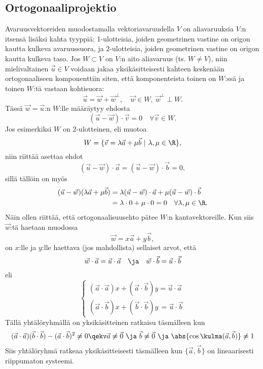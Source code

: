 
\subsection*{Ortogonaaliprojektio}

Avaruusvektoreiden muodostamalla vektoriavaruudella $V$ on aliavaruuksia $V$:n itsensä lisäksi
kahta tyyppiä: 1-ulotteisia, joiden geometrinen vastine on origon kautta kulkeva avaruussuora,
ja 2-ulotteisia, joiden geometrinen vastine on origon kautta kulkeva taso.
Jos $W \subset V$ on $V$:n aito aliavaruus (ts. $W \neq V$), niin mielivaltainen $\vec u \in V$
voidaan jakaa yksikäsitteisesti kahteen keskenään ortogonaaliseen komponenttiin siten, että 
komponenteista toinen on $W$:ssä ja toinen $W$:tä vastaan kohtisuora:
\[
\vec u = \vec w + \vec w^{\perp}, \quad  \vec w \in W, \ \vec w^{\perp} \perp W.
\]
Tässä $\vec w = \vec u$:n  $W$:lle määräytyy ehdosta
\[
(\vec u - \vec w) \cdot \vec v = 0 \quad \forall \vec v \in W.
\]
Jos esimerkiksi $W$ on 2-ulotteinen, eli muotoa
\[
W=\{\vec v = \lambda \vec a + \mu \vec b \ | \ \lambda, \mu \in \R \},
\]
niin riittää asettaa ehdot
\[
(\vec u - \vec w) \cdot \vec a =(\vec u -\vec w) \cdot \vec b =0,
\]
sillä tällöin on myös
\begin{align*}
(\vec u - \vec w)(\lambda \vec a + \mu \vec b)
             &=\lambda(\vec u - \vec w) \cdot \vec a + \mu (\vec u-\vec w) \cdot \vec b \\
             &=\lambda \cdot 0 + \mu \cdot 0 = 0 \quad \forall \lambda, \mu \in \R.
\end{align*}
Näin ollen riittää, että ortogonaalisuusehto pätee $W$:n kantavektoreille. Kun siis $\vec w$:tä
haetaan muodossa
\[
\vec w = x \vec a +y \vec b,
\]
on $x$:lle ja $y$:lle haettava (jos mahdollista) sellaiset arvot, että
\[
\vec w \cdot \vec a = \vec u \cdot \vec a \quad \ja \quad \vec w \cdot \vec b 
                    = \vec u \cdot \vec b
\]
eli
\[ \begin{cases}
(\vec a \cdot \vec a)x+(\vec a \cdot \vec b)y  = \vec u \cdot \vec a \\
(\vec a \cdot \vec b)x+(\vec b \cdot \vec b)y\,= \vec u \cdot \vec b
\end{cases} \]
Tällä yhtälöryhmällä on yksikäsitteinen ratkaisu täsmälleen kun
\[
(\vec a \cdot \vec a)(\vec b \cdot \vec b) - (\vec a \cdot \vec b)^2 \neq 0
                                           \qekv \vec a \neq \vec 0\ 
                                            \ja\ \vec b \neq \vec 0\ 
                                            \ja\ \abs{\cos{\kulma(\vec a,\vec b)}} \neq 1
\]
Siis yhtälöryhmä ratkeaa yksikäsitteisesti täsmälleen kun $\{\vec a, \vec b\}$ on lineaarisesti
riippumaton systeemi.

